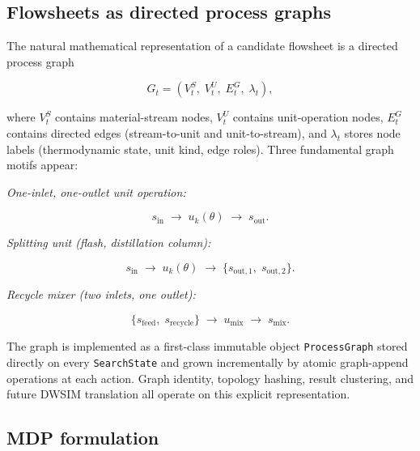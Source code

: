 \documentclass[11pt,a4paper]{article}
\theoremstyle{definition}
\theoremstyle{plain}
\newcommand{\SearchState}{\texttt{SearchState}}
\newcommand{\ProcessGraph}{\texttt{ProcessGraph}}
\begin{document}
\subsection{Flowsheets as directed process graphs}
\label{sec:process_graph}

The natural mathematical representation of a candidate flowsheet is a directed process graph

\begin{equation}
 G_t = (V_t^S,\; V_t^U,\; E_t^G,\; \lambda_t),
\end{equation}

where $V_t^S$ contains material-stream nodes, $V_t^U$ contains unit-operation nodes, $E_t^G$ contains directed edges (stream-to-unit and unit-to-stream), and $\lambda_t$ stores node labels (thermodynamic state, unit kind, edge roles). Three fundamental graph motifs appear:

\medskip
\noindent\textit{One-inlet, one-outlet unit operation:}

\begin{equation}
 s_{\mathrm{in}} \;\longrightarrow\; u_k(\theta)
 \;\longrightarrow\; s_{\mathrm{out}}.
\end{equation}

\noindent\textit{Splitting unit (flash, distillation column):}

\begin{equation}
 s_{\mathrm{in}} \;\longrightarrow\; u_k(\theta)
 \;\longrightarrow\; \{s_{\mathrm{out},1},\; s_{\mathrm{out},2}\}.
\end{equation}

\noindent\textit{Recycle mixer (two inlets, one outlet):}

\begin{equation}
 \{s_{\mathrm{feed}},\; s_{\mathrm{recycle}}\}
 \;\longrightarrow\; u_{\mathrm{mix}}
 \;\longrightarrow\; s_{\mathrm{mix}}.
\end{equation}

The graph is implemented as a first-class immutable object \ProcessGraph{} stored directly on every \SearchState{} and grown incrementally by atomic graph-append operations at each action. Graph identity, topology hashing, result clustering, and future DWSIM translation all operate on this explicit representation.

\subsection{MDP formulation}
\label{sec:mdp_formal}
\end{document}
